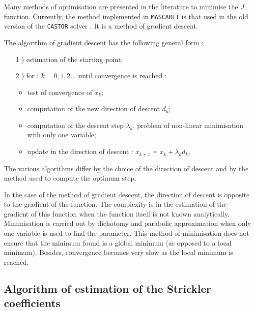 \vspace{0.5cm}

Many methods of optimisation are presented in the literature to minimise the $J$ function. Currently, the method implemented in \texttt{MASCARET} is that used in the old version of the \texttt{CASTOR} solver \cite{LEBOSSE89_1}\cite{LEBOSSE89_2}\cite{LEBOSSE89_3}. It is a method of gradient descent.

\vspace{0.5cm}

The algorithm of gradient descent has the following general form :
\begin{itemize}
 \item[1]) estimation of the starting point;
 \item[2]) for : $k= 0,1,2...$ until convergence is reached :
   \begin{itemize}
     \item test of convergence of $x_k$;
     \item computation of the new direction of descent $d_k$;
     \item computation of the descent step $\lambda_k$: problem of non-linear minimisation with only one variable;
     \item update in the direction of descent : $x_{k+1} = x_k + \lambda_k d_k$.
   \end{itemize}
\end{itemize}

\vspace{0.5cm}

The various algorithms differ by the choice of the direction of descent and by the method used to compute the optimum step.

\vspace{0.5cm}

In the case of the method of gradient descent, the direction of descent is opposite to the gradient of the function. The complexity is in the estimation of the gradient of this function when the function itself is not known analytically. Minimisation is carried out by dichotomy and parabolic approximation when only one variable is used to find the parameter. This method of minimisation does not ensure that the minimum found is a global minimum (as opposed to a local minimum). Besides, convergence becomes very slow as the local minimum is reached.

\subsection{Algorithm of estimation of the Strickler coefficients}

